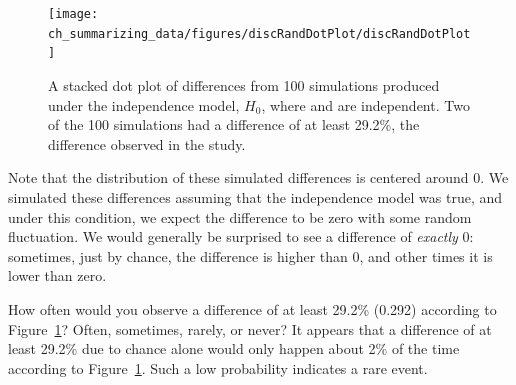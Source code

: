 \begin{figure}[ht]
\centering
\texttt{[image: ch\_summarizing\_data/figures/discRandDotPlot/discRandDotPlot]}
\caption{A stacked dot plot of differences from 100 simulations produced under the independence model, $H_0$, where  and  are independent. Two of the 100 simulations had a difference of at least 29.2\%, the difference observed in the study.}
\label{discRandDotPlot}
\end{figure}

Note that the distribution of these simulated differences is centered around 0. We simulated these differences assuming that the independence model was true, and under this condition, we expect the difference to be zero with some random fluctuation. We would generally be surprised to see a difference of \emph{exactly} 0: sometimes, just by chance, the difference is higher than 0, and other times it is lower than zero.

\begin{example}{How often would you observe a difference of at least 29.2\% (0.292) according to Figure~\ref{discRandDotPlot}? Often, sometimes, rarely, or never?}
It appears that a difference of at least 29.2\% due to chance alone would only happen about 2\% of the time according to Figure~\ref{discRandDotPlot}. Such a low probability indicates a rare event.
\end{example}

